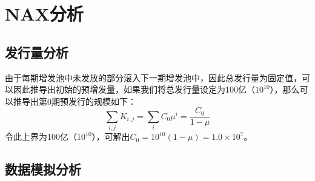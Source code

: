\section{NAX分析}
\subsection{发行量分析}
由于每期增发池中未发放的部分滚入下一期增发池中，因此总发行量为固定值，可以因此推导出初始的预增发量，如果我们将总发行量设定为100亿（\(10^{10}\)），那么可以推导出第0期预发行的规模如下：
\begin{equation}
  \sum_{i,j} K_{i,j} = \sum_i C_0 \mu^i = \frac{C_0}{1-\mu}
\end{equation}
  令此上界为100亿（\(10^{10}\)），可解出\(C_0 = 10^{10}(1-\mu) = 1.0\times10^7\)。

\subsection{数据模拟分析}

